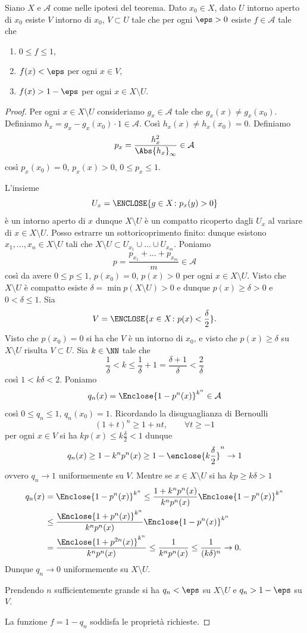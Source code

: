 \begin{lemma}
Siano $X$ e ${\mathcal A}$ come nelle ipotesi del teorema.
Dato $x_0\in X$, dato $U$ intorno aperto di $x_0$
esiste $V$ intorno di $x_0$, $V\subset U$
tale che per ogni $\eps>0$ 
esiste $f\in {\mathcal A}$ tale che 
\begin{enumerate}
\item    $0 \le f \le 1$,
\item    $f(x) < \eps$ per ogni $x\in V$,
\item    $f(x) > 1-\eps$ per ogni $x \in X\setminus U$.
\end{enumerate}
\end{lemma}
\begin{proof}
Per ogni $x\in X\setminus U$ 
consideriamo $g_x \in {\mathcal A}$ 
tale che $g_x(x)\neq g_x(x_0)$.
Definiamo $h_x = g_x - g_x(x_0)\cdot 1 \in {\mathcal A}$.
Così $h_x(x) \neq  h_x(x_0) = 0$.
Definiamo
\[
 p_x = \frac{h_x^2}{\Abs{h_x}_\infty} \in {\mathcal A}
\]
così $p_x(x_0)=0$, $p_x(x)>0$,
$0\le p_x \le 1$.

L'insieme 
\[
U_x = \ENCLOSE{g\in X\colon p_x(y)>0}
\]
è un intorno aperto di $x$
dunque $X\setminus U$ è un compatto 
ricoperto dagli $U_x$ al variare di $x\in X\setminus U$.
Posso estrarre un sottoricoprimento finito:
dunque esistono $x_1,\dots,x_n\in X\setminus U$ 
tali che $X\setminus U \subset U_{x_1} \cup \dots \cup U_{x_m}$.
Poniamo
\[
  p = \frac{p_{x_1}+ \dots + p_{x_m}}{m} \in {\mathcal A}
\]
così da avere $0\le p \le 1$, $p(x_0)=0$,
$p(x)>0$ per ogni $x\in X\setminus U$.
Visto che $X\setminus U$ è compatto 
esiste $\delta = \min p(X\setminus U)>0$ 
e dunque $p(x)\ge \delta > 0$ e $0<\delta\le 1$.
Sia 
\[
  V= \ENCLOSE{x\in X \colon p(x) < \frac \delta 2}.
\]
Visto che $p(x_0)=0$ si ha che $V$ è un intorno di $x_0$,
e visto che 
$p(x) \ge \delta$ su $X\setminus U$
risulta $V\subset U$.
Sia $k\in \NN$ tale che 
\[
 \frac 1 \delta < k \le \frac 1 \delta + 1 
 = \frac{\delta+1}{\delta}
 < \frac 2 \delta
\]
così $1 < k \delta < 2$.
Poniamo
\[
 q_n(x) = \Enclose{1-p^n(x)}^{k^n} \in {\mathcal A}
\]
così $0\le q_n \le 1$, $q_n(x_0) = 1$.
Ricordando la disuguaglianza di Bernoulli
\[
  (1+t)^n \ge 1 + nt, \qquad \forall t\ge -1
\]
per ogni $x\in V$ si ha $k p(x)\le k \frac \delta 2 < 1$ 
dunque
\[
q_n(x) \ge 1- k^n p^n(x)
\ge 1 - \enclose{k \frac \delta 2}^n \to 1
\]
ovvero $q_n \to 1$ uniformemente su $V$.
Mentre se $x\in X\setminus U$ 
si ha $kp \ge k\delta > 1$
\begin{align*}
 q_n(x) 
 &= \Enclose{1-p^n(x)}^{k^n}
 \le \frac{1+k^np^n(x)}{k^np^n(x)}
 \Enclose{1-p^n(x)}^{k^n}\\
 &\le \frac{\Enclose{1+p^n(x)}^{k^n}}{k^n p^n(x)}
 \Enclose{1-p^n(x)}^{k^n}\\
 &= \frac{\Enclose{1+p^{2n}(x)}^{k^n}}{k^n p^n(x)}
 \le \frac{1}{k^n p^n(x)}
 \le \frac{1}{(k\delta)^n} \to 0.
\end{align*}
Dunque $q_n\to 0$ uniformemente su $X\setminus U$.

Prendendo $n$ sufficientemente grande 
si ha $q_n<\eps$ su $X\setminus U$ 
e $q_n > 1-\eps$ su $V$.

La funzione $f=1-q_n$ soddisfa le proprietà richieste.
\end{proof}

